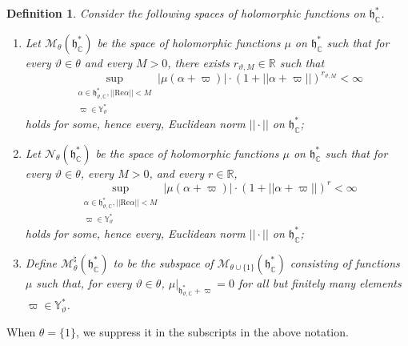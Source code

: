 \documentclass[iccmp]{ipbook}
\newcommand{\BC}{{\mathbb {C}}}
\newcommand{\BR}{{\mathbb {R}}}
\newcommand{\BY}{{\mathbb {Y}}}
\newcommand{\CM}{{\mathcal {M}}}
\newcommand{\CN}{{\mathcal {N}}}
\newcommand{\Fh}{{\mathfrak {h}}}
\renewcommand{\Re}{{\mathrm{Re}}}
\def\alp{{\alpha}}
\def\vpi{\varpi}
\newtheorem{defin}[thm]{Definition}
\begin{document}
\begin{defin}\label{defin:Schwartzmultiplier}
Consider the following spaces of holomorphic functions on $\Fh^*_\BC$.
\begin{enumerate}
\item Let $\CM_\theta(\Fh^*_\BC)$ be the space of holomorphic functions $\mu$ on $\Fh^*_\BC$ such that for every $\vartheta\in \theta$ and every $M>0$, there exists $r_{\vartheta,M}\in \BR$ such that 
\begin{equation}\label{eq:schwartzmultiplier:1}
\sup_{
\substack{
\alp\in \Fh^*_{\vartheta,\BC},||\Re\alp||<M
\\
\vpi\in \BY^*_\vartheta
}
}
|\mu(\alp+\vpi)|
\cdot 
(1+||\alp+\vpi||)^{r_{\vartheta,M}}<\infty
\end{equation}
holds for some, hence every, Euclidean norm $||\cdot||$ on $\Fh^*_\BC$;

\item Let $\CN_\theta(\Fh^*_\BC)$ be the space of holomorphic functions $\mu$ on $\Fh^*_\BC$ such that for every $\vartheta\in \theta$, every $M>0$, and every $r\in \BR$, 
\begin{equation}\label{eq:schwartzmultiplier:2}
\sup_{
\substack{
\alp\in \Fh^*_{\vartheta,\BC},
||\Re\alp||<M
\\
\vpi\in \BY^*_\vartheta
}
}
|\mu(\alp+\vpi)|
\cdot 
(1+||\alp+\vpi||)^r<\infty
\end{equation}
holds for some, hence every, Euclidean norm $||\cdot||$ on $\Fh^*_\BC$;

\item Define $\CM^\natural_\theta(\Fh^*_\BC)$ to be the subspace of $\CM_{\theta\cup\{1\}}(\Fh^*_\BC)$ consisting of functions $\mu$ such that, for every $\vartheta\in \theta$, $\mu|_{\Fh^*_{\vartheta,\BC}+\vpi} = 0$ for all but finitely many elements $\vpi\in \BY^*_\vartheta$.
\end{enumerate}
\end{defin}
When $\theta = \{1\}$, we suppress it in the subscripts in the above notation.
\end{document}
